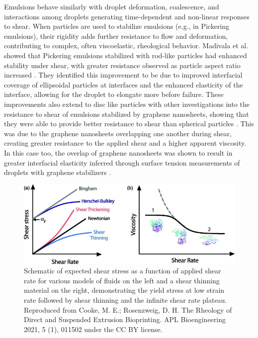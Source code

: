 Emulsions behave similarly with droplet deformation, coalescence, and interactions 
among droplets generating time-dependent and non-linear responses to shear. When particles are used to stabilize emulsions (e.g., in Pickering emulsions), their rigidity 
adds further resistance to flow and deformation, contributing to complex, often viscoelastic, rheological behavior.
Madivala et al. showed that Pickering emulsions stabilized with rod-like particles had enhanced stability under shear, with greater resistance observed as particle aspect ratio increased 
\cite{madivala_exploiting_2009}. They identified this improvement to be due to improved interfacial coverage of ellipsoidal particles at interfaces and the enhanced elasticity of the interface,
allowing for the droplet to elongate more before failure. These improvements also extend to disc like particles with other investigations into the resistance to shear of emulsions stabilized by
graphene nanosheets, showing that they were able to provide better resistance to shear than spherical particles \cite{imperiali_simple_2014}. This was due to the graphene nanosheets overlapping one
another during shear, creating greater resistance to the applied shear and a higher apparent viscosity. In this case too, the overlap of graphene nanosheets was shown to result in greater interfacial
elasticity inferred through surface tension measurements of droplets with graphene stabilizers \cite{sun_assembly_2013}.

\begin{figure}
    \centering
    \includegraphics[scale = 4]{../figures/literature_review/Flow-curves.png}
    \caption{Schematic of expected shear stress as a function of applied shear rate for various models of fluids on the left and a shear thinning material on the right, demonstrating
             the yield stress at low strain rate followed by shear thinning and the infinite shear rate plateau. Reproduced from Cooke, M. E.; Rosenzweig, D. H. The Rheology of Direct 
             and Suspended Extrusion Bioprinting. APL Bioengineering 2021, 5 (1), 011502 under the CC BY license.}
    \label{fig:shear_theory}
\end{figure}

